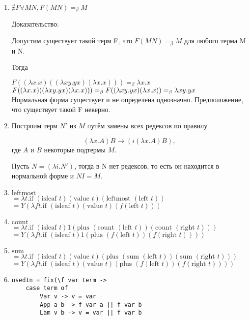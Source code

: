 \documentclass[fontsize=14pt, paper=a4, pagesize, DIV=calc]{article}
\begin{document}
\begin{enumerate}
\item
$\nexists F \forall M N, F (M N) =_{\beta} M$

Доказательство:

Допустим существует такой терм F, что $F (M N) =_{\beta} M$ для любого терма M и N.

Тогда

$F ((\lambda x . x)((\lambda x y . y x)(\lambda x . x))) =_{\beta} \lambda x . x$\\
$F ((\lambda x . x)((\lambda x y . y x)(\lambda x . x))) \\
=_{\beta} F ((\lambda x y . y x)(\lambda x . x))
=_{\beta} \lambda x y . y x $\\

Нормальная форма существует и не определена однозначно. Предположение, что существует такой F
неверно.

\clearpage

\item
Построим терм $N'$ из $M$ путём замены всех редексов по правилу

$$(\lambda x . A) B \rightarrow (i (\lambda x . A) B),$$ где $A$ и $B$ некоторые подтермы $M$.

Пусть $N = (\lambda i . N')$, тогда в N нет редексов, то есть он находится в нормальной форме
и $NI = M$.

\item 
$\text{leftmost}$\\
$ = \lambda t . \text{if } (\text{isleaf } t) (\text{value } t) (\text{leftmost } (\text{left } t))$\\
$ = Y (\lambda f t . \text{if } (\text{isleaf } t) (\text{value } t) (f (\text{left } t)))$\\

\item
$\text{count}$\\
$ = \lambda t . \text{if } (\text{isleaf } t) 1 (\text{plus } (\text{count } (\text{left } t)) (\text{count } (\text{right } t)))$\\
$ = Y (\lambda f t . \text{if } (\text{isleaf } t) 1 (\text{plus } (f (\text{left } t)) (f (\text{right } t))))$

\item
$\text{sum}$\\
$ = \lambda t  .\text{if } (\text{isleaf } t) (\text{value } t) (\text{plus } (\text{sum } (\text{left } t)) (\text{sum } (\text{right } t)))$\\
$ = Y (\lambda f t . \text{if } (\text{isleaf } t) (\text{value } t) (\text{plus } (f (\text{left } t)) (f (\text{right } t))))$

\item
\begin{verbatim}
usedIn = fix(\f var term ->
    case term of
        Var v -> v = var
        App a b -> f var a || f var b
        Lam v b -> v = var || f var b
\end{verbatim}

\end{enumerate}
\end{document}
